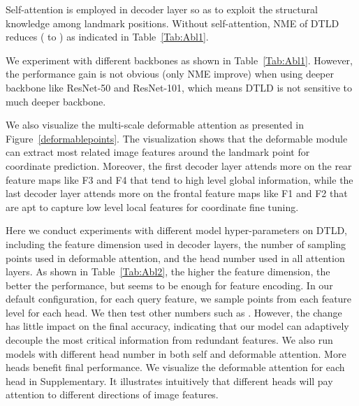  Self-attention is employed in decoder layer so as to exploit the structural knowledge among landmark positions. Without self-attention, NME of DTLD reduces  ( to ) as indicated in Table~\ref{Tab:Abl1}.


 We experiment with different backbones as shown in Table~\ref{Tab:Abl1}. However,
the performance gain is not obvious (only NME improve) when using deeper backbone like ResNet-50 and ResNet-101, which means DTLD is not sensitive to much deeper backbone.


 We also visualize the multi-scale deformable attention as presented in Figure~\ref{deformablepoints}.
The visualization shows that the deformable module can extract most related image features around the landmark point for coordinate prediction. Moreover, the first decoder layer attends more on the rear feature maps like F3 and F4 that tend to high level global information, while the last decoder layer attends more on the frontal feature maps like F1 and F2 that are apt to capture low level local features for coordinate fine tuning.







 Here we conduct experiments with different model hyper-parameters on DTLD, including the feature dimension  used in decoder
layers, the number of sampling points  used in deformable attention, and the head number used in all attention layers. As shown in Table~\ref{Tab:Abl2}, the higher the feature dimension, the better the performance, but  seems to be enough for feature encoding.  In our default configuration, for each query feature, we sample  points from each feature level for each head. We then test other numbers such as . However, the change has little impact on the final accuracy, indicating that our model can adaptively decouple the most critical information from redundant features.
We also run models with different head number in both self and deformable attention. More heads benefit final performance.
We visualize the deformable attention for each head in Supplementary. It illustrates intuitively that different heads will pay attention to different directions of image features.

